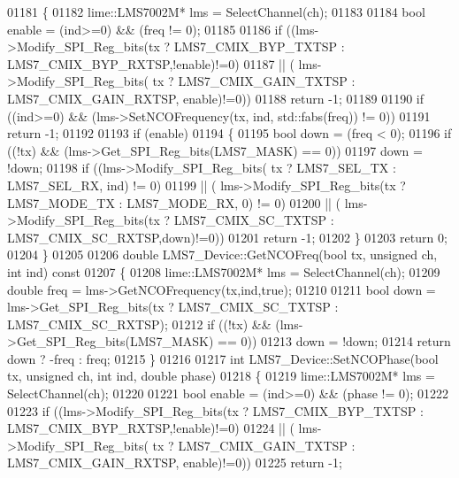 \begin{DoxyCode}
{{{01181 \{
01182     lime::LMS7002M* lms = SelectChannel(ch);
01183 
01184     \textcolor{keywordtype}{bool} enable = (ind>=0) && (freq != 0);
01185 
01186     \textcolor{keywordflow}{if} ((lms->Modify_SPI_Reg_bits(tx ? LMS7_CMIX_BYP_TXTSP : LMS7_CMIX_BYP_RXTSP,!enable)!=0)
01187     || ( lms->Modify_SPI_Reg_bits( tx ? LMS7_CMIX_GAIN_TXTSP : 
      LMS7_CMIX_GAIN_RXTSP, enable)!=0))
01188         \textcolor{keywordflow}{return} -1;
01189 
01190     \textcolor{keywordflow}{if} ((ind>=0) && (lms->SetNCOFrequency(tx, ind, std::fabs(freq)) != 0))
01191         \textcolor{keywordflow}{return} -1;
01192 
01193     \textcolor{keywordflow}{if} (enable)
01194     \{
01195         \textcolor{keywordtype}{bool} down = (freq < 0);
01196         \textcolor{keywordflow}{if} ((!tx) && (lms->Get_SPI_Reg_bits(LMS7_MASK) == 0))
01197             down = !down;
01198         \textcolor{keywordflow}{if} ((lms->Modify_SPI_Reg_bits( tx ? LMS7_SEL_TX : LMS7_SEL_RX, ind) != 0)
01199         || ( lms->Modify_SPI_Reg_bits(tx ? LMS7_MODE_TX : LMS7_MODE_RX, 0) != 0)
01200         || ( lms->Modify_SPI_Reg_bits(tx ? LMS7_CMIX_SC_TXTSP : 
      LMS7_CMIX_SC_RXTSP,down)!=0))
01201             \textcolor{keywordflow}{return} -1;
01202     \}
01203     \textcolor{keywordflow}{return} 0;
01204 \}
01205 
01206 \textcolor{keywordtype}{double} LMS7_Device::GetNCOFreq(\textcolor{keywordtype}{bool} tx, \textcolor{keywordtype}{unsigned} ch, \textcolor{keywordtype}{int} ind)\textcolor{keyword}{ const}
01207 \textcolor{keyword}{}\{
01208     lime::LMS7002M* lms = SelectChannel(ch);
01209     \textcolor{keywordtype}{double} freq = lms->GetNCOFrequency(tx,ind,\textcolor{keyword}{true});
01210 
01211     \textcolor{keywordtype}{bool} down = lms->Get_SPI_Reg_bits(tx ? LMS7_CMIX_SC_TXTSP : 
      LMS7_CMIX_SC_RXTSP);
01212     \textcolor{keywordflow}{if} ((!tx) && (lms->Get_SPI_Reg_bits(LMS7_MASK) == 0))
01213         down = !down;
01214     \textcolor{keywordflow}{return} down ? -freq : freq;
01215 \}
01216 
01217 \textcolor{keywordtype}{int} LMS7_Device::SetNCOPhase(\textcolor{keywordtype}{bool} tx, \textcolor{keywordtype}{unsigned} ch, \textcolor{keywordtype}{int} ind, \textcolor{keywordtype}{double} phase)
01218 \{
01219     lime::LMS7002M* lms = SelectChannel(ch);
01220 
01221     \textcolor{keywordtype}{bool} enable = (ind>=0) && (phase != 0);
01222 
01223     \textcolor{keywordflow}{if} ((lms->Modify_SPI_Reg_bits(tx ? LMS7_CMIX_BYP_TXTSP : LMS7_CMIX_BYP_RXTSP,!enable)!=0)
01224     || ( lms->Modify_SPI_Reg_bits( tx ? LMS7_CMIX_GAIN_TXTSP : 
      LMS7_CMIX_GAIN_RXTSP, enable)!=0))
01225         \textcolor{keywordflow}{return} -1;
}}}
\end{DoxyCode}
